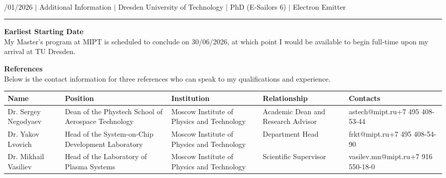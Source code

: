 \documentclass[a4paper,12pt]{article}
\begin{document}
{\centering
  {\scshape {}} \\
  {\fontsize{10}{10}/01/2026} $|$
  {\fontsize{10}{10}\selectfont Additional Information} $|$
  {\fontsize{10}{10}\selectfont Dresden University of Technology} $|$
  {\fontsize{10}{10}\selectfont PhD (E-Sailors 6)} $|$
  {\fontsize{10}{10}\selectfont Electron Emitter}
\par}
\vspace{-20pt}
\noindent\rule{\textwidth}{0.5pt}

\vspace{-10pt}

\noindent \textbf{Earliest Starting Date}\\
My Master's program at MIPT is scheduled to conclude on 30/06/2026, at which point I would be available to begin full-time upon my arrival at TU Dresden.

\vspace{5pt}

\noindent \textbf{References}\\
Below is the contact information for three references who can speak to my qualifications and experience.
\vspace{-20pt}

\begin{table}[htbp]
  \centering
  \small
  \renewcommand{\arraystretch}{1.5}
  \begin{tabularx}{\textwidth}{@{}>{\centering\arraybackslash}X>{\centering\arraybackslash}X>{\centering\arraybackslash}X>{\centering\arraybackslash}X>{\centering\arraybackslash}X@{}}
    \toprule
    \textbf{Name} & \textbf{Position} & \textbf{Institution} & \textbf{Relationship} & \textbf{Contacts} \\
    \midrule
    Dr. Sergey Negodyaev & Dean of the Phystech School of Aerospace Technology & Moscow Institute of Physics and Technology & Academic Dean and Research Advisor & astech@mipt.ru\newline +7 495 408-53-44 \\
    \midrule
    Dr. Yakov Lvovich & Head of the System-on-Chip Development Laboratory & Moscow Institute of Physics and Technology & Department Head & frkt@mipt.ru\newline +7 495 408-54-90 \\
    \midrule
    Dr. Mikhail Vasiliev & Head of the Laboratory of Plasma Systems & Moscow Institute of Physics and Technology & Scientific Supervisor & vasilev.mn@mipt.ru\newline +7 916 550-18-0 \\
    \bottomrule
  \end{tabularx}
\end{table}
\end{document}
